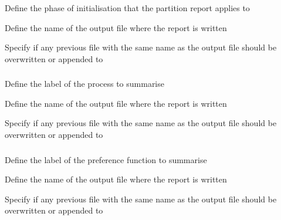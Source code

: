  {Define the phase of initialisation that the partition report applies to}

 {Define the name of the output file where the report is written}

 {Specify if any previous file with the same name as the output file should be overwritten or appended to}

\subsubsection[Print a summary of a process]{}

 {Define the label of the process to summarise}

 {Define the name of the output file where the report is written}

 {Specify if any previous file with the same name as the output file should be overwritten or appended to}

\subsubsection[Print a summary of a preference function]{}

 {Define the label of the preference function to summarise}

 {Define the name of the output file where the report is written}

 {Specify if any previous file with the same name as the output file should be overwritten or appended to}

